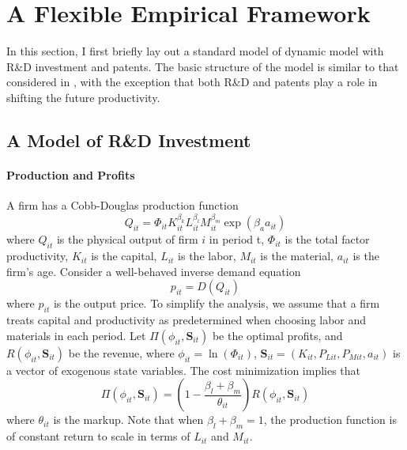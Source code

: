 
\section{A Flexible Empirical Framework}\label{Sec2}
In this section, I first briefly lay out a standard model of dynamic model with R\&D investment and patents. The basic structure of the model is similar to that considered in \cite{Awetal.2011,Doraszelski2013,Peters2016, Peters2017}, with the exception that both R\&D and patents play a role in shifting the future productivity. 

\subsection{A Model of R\&D Investment}

\paragraph{Production and Profits} A firm has a Cobb-Douglas production function
\begin{equation}
Q_{it} = \Phi_{it}K_{it}^{\beta_{k}}L_{it}^{\beta_l}M_{it}^{\beta_m}\exp{(\beta_a a_{it})}
\end{equation}
where $Q_{it}$ is the physical output of firm $i$ in period t, $\Phi_{it}$ is the total factor productivity, $K_{it}$ is the capital, $L_{it}$ is the labor, $M_{it}$ is the material, $a_{it}$ is the firm's age. Consider a well-behaved inverse demand equation
\begin{equation}
    p_{it} = D(Q_{it})
\end{equation}
where $p_{it}$ is the output price. To simplify the analysis, we assume that a firm treats capital and productivity as predetermined when choosing labor and materials in each period. Let $\Pi(\phi_{it},\mathbf{S}_{it})$ be the optimal profits, and $R(\phi_{it},\mathbf{S}_{it})$ be the revenue, where $\phi_{it}=\ln(\Phi_{it})$, $\mathbf{S}_{it}=(K_{it}, P_{Lit}, P_{Mit}, a_{it})$ is a vector of exogenous state variables. The cost minimization implies that
\begin{equation}
    \Pi(\phi_{it},\mathbf{S}_{it}) = (1-\frac{\beta_l+\beta_m}{\theta_{it}})R(\phi_{it},\mathbf{S}_{it})
\end{equation}
where $\theta_{it}$ is the markup. Note that when $\beta_l+\beta_m=1$, the production function is of constant return to scale in terms of $L_{it}$ and $M_{it}$.

